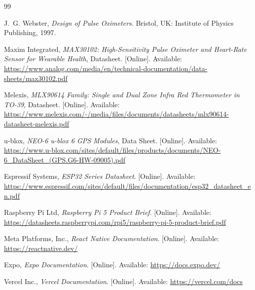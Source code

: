 \documentclass[12pt,a4paper,oneside]{report}
\begin{document}
\newpage
{}
\begin{thebibliography}{99}

J.~G. Webster, \textit{Design of Pulse Oximeters}. Bristol, UK: Institute of Physics Publishing, 1997.

Maxim Integrated, \textit{MAX30102: High-Sensitivity Pulse Oximeter and Heart-Rate Sensor for Wearable Health}, Datasheet. [Online]. Available: \url{https://www.analog.com/media/en/technical-documentation/data-sheets/max30102.pdf}

Melexis, \textit{MLX90614 Family: Single and Dual Zone Infra Red Thermometer in TO-39}, Datasheet. [Online]. Available: \url{https://www.melexis.com/-/media/files/documents/datasheets/mlx90614-datasheet-melexis.pdf}

u-blox, \textit{NEO-6 u-blox 6 GPS Modules}, Data Sheet. [Online]. Available: \url{https://www.u-blox.com/sites/default/files/products/documents/NEO-6_DataSheet_(GPS.G6-HW-09005).pdf}

Espressif Systems, \textit{ESP32 Series Datasheet}. [Online]. Available: \url{https://www.espressif.com/sites/default/files/documentation/esp32_datasheet_en.pdf}

Raspberry Pi Ltd, \textit{Raspberry Pi 5 Product Brief}. [Online]. Available: \url{https://datasheets.raspberrypi.com/rpi5/raspberry-pi-5-product-brief.pdf}

Meta Platforms, Inc., \textit{React Native Documentation}. [Online]. Available: \url{https://reactnative.dev/}

Expo, \textit{Expo Documentation}. [Online]. Available: \url{https://docs.expo.dev/}

Vercel Inc., \textit{Vercel Documentation}. [Online]. Available: \url{https://vercel.com/docs}

\end{thebibliography}
\end{document}
